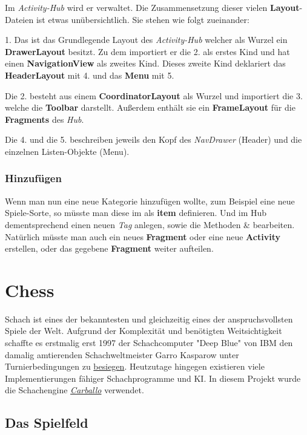 Im \emph{Activity-Hub} wird er verwaltet. Die Zusammensetzung dieser vielen
\textbf{Layout}-Dateien ist etwas unübersichtlich. Sie stehen wie folgt
zueinander:

1. Das ist das Grundlegende Layout des \emph{Activity-Hub} welcher als Wurzel
ein \textbf{DrawerLayout} besitzt. Zu dem importiert er die 2. als erstes Kind 
und hat einen \textbf{NavigationView} als zweites Kind. Dieses zweite Kind
deklariert das \textbf{HeaderLayout} mit 4. und das \textbf{Menu} mit 5.

Die 2. besteht aus einem \textbf{CoordinatorLayout} als Wurzel und importiert
die 3. welche die \textbf{Toolbar} darstellt. Außerdem enthält sie ein
\textbf{FrameLayout} für die \textbf{Fragments} des \emph{Hub}.

Die 4. und die 5. beschreiben jeweils den Kopf des \emph{NavDrawer} (Header) und
die einzelnen Listen-Objekte (Menu).

\subsubsection{Hinzufügen}
Wenn man nun eine neue Kategorie hinzufügen wollte, zum Beispiel eine neue
Spiele-Sorte, so müsste man diese im  als
\textbf{item} definieren. Und im Hub dementsprechend einen neuen \emph{Tag}
anlegen, sowie die Methoden  \&
 bearbeiten. Natürlich müsste man auch ein neues
\textbf{Fragment} oder eine neue \textbf{Activity} erstellen, oder das gegebene
\textbf{Fragment}  weiter aufteilen.


\section{Chess}
\sectionauthor{\oliver}

Schach ist eines der bekanntesten und gleichzeitig eines der anspruchsvollsten
Spiele der Welt. Aufgrund der Komplexität und benötigten Weitsichtigkeit
schaffte es erstmalig erst 1997 der Schachcomputer "Deep Blue" von IBM den
damalig amtierenden Schachweltmeister Garro Kasparow unter Turnierbedingungen  zu \href{http://www.chessgames.com/perl/chesscollection?cid=1014770}{besiegen}.
Heutzutage hingegen existieren viele Implementierungen
fähiger Schachprogramme und KI. In diesem Projekt wurde die Schachengine
\hyperlink{https://github.com/albertoruibal/carballo}{\emph{Carballo}}
verwendet.

\subsection{Das Spielfeld}

